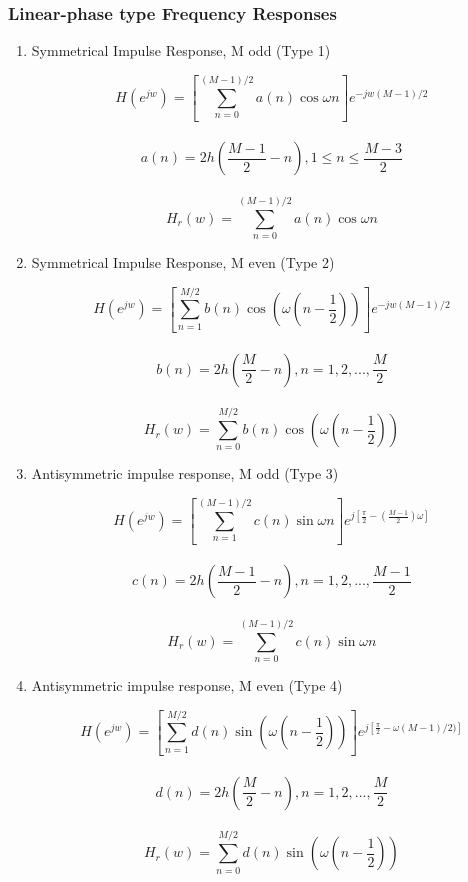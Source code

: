 \documentclass{article}
\begin{document}
\subsubsection{Linear-phase type Frequency Responses}
\begin{enumerate}
    \item Symmetrical Impulse Response, M odd (Type 1)
    \begin{center}
        $$H(e^{jw})=[\sum_{n=0}^{(M-1)/2}a(n)\cos\omega n ]e^{-jw(M-1)/2}$$ \\
        \vspace{1em}
        $$a(n) = 2h(\frac{M-1}{2}-n), 1 \leq n \leq \frac{M-3}{2}$$ \\
        \vspace{1em}
        $$H_r(w)=\sum_{n=0}^{(M-1)/2}a(n)\cos\omega n$$
    \end{center}
    \item Symmetrical Impulse Response, M even (Type 2)
    \begin{center}
        $$H(e^{jw})=[\sum_{n=1}^{M/2}b(n)\cos(\omega( n-\frac{1}{2})) ]e^{-jw(M-1)/2}$$ \\
        \vspace{1em}
        $$b(n) = 2h(\frac{M}{2}-n), n = 1, 2,...,\frac{M}{2}$$ \\
        \vspace{1em}
        $$H_r(w)=\sum_{n=0}^{M/2}b(n)\cos(\omega(n-\frac{1}{2}))$$
    \end{center}
    \item Antisymmetric impulse response, M odd (Type 3)
    \begin{center}
        $$H(e^{jw})=[\sum_{n=1}^{(M-1)/2}c(n)\sin\omega n ]e^{j[\frac{\pi}{2}-(\frac{M-1}{2})\omega]}$$ \\
        \vspace{1em}
        $$c(n) = 2h(\frac{M-1}{2}-n), n = 1, 2,...,\frac{M-1}{2}$$ \\
        \vspace{1em}
        $$H_r(w)=\sum_{n=0}^{(M-1)/2}c(n)\sin\omega n$$
    \end{center}
    \item Antisymmetric impulse response, M even (Type 4)
    \begin{center}
        $$H(e^{jw})=[\sum_{n=1}^{M/2}d(n)\sin(\omega (n - \frac{1}{2}))]e^{j[\frac{\pi}{2}-\omega{(M-1)}/{2})]}$$ \\
        \vspace{1em}
        $$d(n) = 2h(\frac{M}{2}-n), n = 1, 2,...,\frac{M}{2}$$ \\
        \vspace{1em}
        $$H_r(w)=\sum_{n=0}^{M/2}d(n)\sin(\omega( n-\frac{1}{2}))$$
    \end{center}
    
\end{enumerate}
\end{document}
